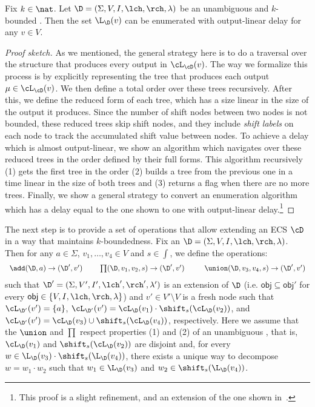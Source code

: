 \begin{proposition}\label{slps:ds:lindelay}
	Fix $k\in\nat$. Let $\D = (\Sigma, V, I, \lch, \rch, \lambda)$ be an unambiguous and $k$-bounded \dsabbr{}. Then the set $\L_\D(v)$ can be enumerated with output-linear delay for any $v\in V$.
\end{proposition}
\begin{proof}[Proof sketch]

As we mentioned, the general strategy here is to do a traversal over the structure that produces every output in $\cL_{\cD}(v)$. 
The way we formalize this process is by explicitly representing the tree that produces each output $\mu\in\cL_{\cD}(v)$. 
We then define a total order over these trees recursively. 
After this, we define the reduced form of each tree, which has a size linear in the size of the output it produces. 
Since the number of shift nodes between two nodes is not bounded, these reduced trees skip shift nodes, and they include {\em shift labels} on each node to track the accumulated shift value between nodes.
To achieve a delay which is almost output-linear, we show an algorithm which navigates over these reduced trees in the order defined by their full forms. 
This algorithm recursively (1) gets the first tree in the order (2) builds a tree from the previous one in a time linear in the size of both trees and (3) returns a flag when there are no more trees. 
Finally, we show a general strategy to convert an enumeration algorithm which has a delay equal to the one shown to one with output-linear delay.\footnote{This proof is a slight refinement, and an extension of the one shown in~\cite{cdenested2020}.}
\end{proof}

The next step is to provide a set of operations that allow extending an ECS $\cD$ in a way that maintains $k$-boundedness. Fix an \dsabbr{} $\D = (\Sigma, V, I, \lch, \rch, \lambda)$. Then for any $a \in \Sigma$, $v_1, \ldots, v_4 \in V$ and $s\in\int$, we define the operations:
$$
\begin{array}{rclrclrcl}
	\add(\D,a)\to (\D',v')  \ \ \ \	 &  \prod(\D,v_1, v_2, s)\to (\D',v')   \ \ \ \ \ &  \union(\D,v_3, v_4, s) \to (\D',v')
\end{array}
$$
\noindent such that $\D' = (\Sigma, V', I', \lch', \rch', \lambda')$ is an extension of $\D$ (i.e. $\mathsf{obj} \subseteq \mathsf{obj}'$ for every $\mathsf{obj} \in \{V,I, \lch, \rch, \lambda\}$) and $v' \in V' \setminus V$ is a fresh node such that $\cL_{\D'}(v') = \{a\}$, $\cL_{\D'}(v') = \cL_{\D}(v_1) \cdot \shift_s(\cL_{\D}(v_2))$, and $\cL_{\D'}(v') = \cL_{\D}(v_3) \cup \shift_s(\cL_{\D}(v_4))$, respectively.
Here we assume that the $\union$ and $\prod$ respect properties (1) and (2) of an unambiguous \dsabbr{}, that is, $\cL_{\D}(v_1)$ and $\shift_s(\cL_{\D}(v_2))$ are disjoint and, for every $w \in \L_{\D}(v_3) \cdot \shift_s(\L_{\D}(v_4))$, there exists a unique way to decompose $w = w_1 \cdot w_2$ such that $w_1 \in \L_{\D}(v_3)$ and $w_2 \in \shift_s(\L_{\D}(v_4))$. 

